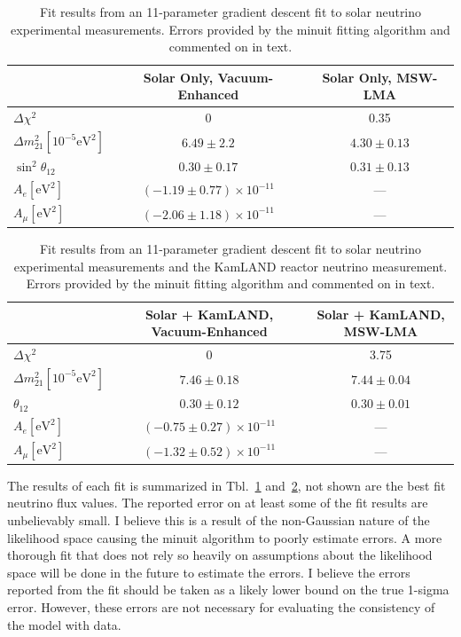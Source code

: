 \begin{table}
    \centering
    \begin{tabular}{l|c|c}
        & Solar Only, Vacuum-Enhanced& Solar Only, MSW-LMA\\
        \hline
        $\Delta \chi^{2}$ & 0 & 0.35\\
        $\Delta m^{2}_{21} [10^{-5}\mathrm{eV}^{2}]$ & $6.49\pm 2.2$ & $4.30\pm0.13$\\
        $\sin^{2}\theta_{12}$& $0.30\pm0.17$ & $0.31\pm 0.13$\\
        $A_{e}[\mathrm{eV}^{2}]$ & $(-1.19\pm 0.77)\times 10^{-11}$ & ---\\
        $A_{\mu}[\mathrm{eV}^{2}]$ & $(-2.06\pm 1.18)\times10^{-11}$ & --- \\
\end{tabular}
    \caption[Solar Only Gradient Descent Fit Results]{Fit results from
    an 11-parameter gradient descent fit to solar neutrino experimental
    measurements. Errors provided by the minuit fitting algorithm and
    commented on in text.}
\label{tbl:cham_fit_results1}
\end{table}
\begin{table}
    \centering
    \begin{tabular}{l|c|c}
        & Solar + KamLAND, Vacuum-Enhanced & Solar + KamLAND, MSW-LMA\\
        \hline
        $\Delta \chi^{2}$ & 0 &3.75\\
        $\Delta m^{2}_{21} [10^{-5}\mathrm{eV}^{2}]$ & $7.46\pm0.18$ & $7.44\pm0.04$\\
        $\theta_{12}$ & $0.30 \pm 0.12$ & $0.30\pm 0.01$\\
        $A_{e}[\mathrm{eV}^{2}]$ & $(-0.75\pm 0.27)\times 10^{-11}$ & ---\\
        $A_{\mu}[\mathrm{eV}^{2}]$ & $(-1.32\pm 0.52)\times10^{-11}$ & --- \\
\end{tabular}
    \caption[Solar + KamLAND Gradient Descent Fit Results]{Fit results from
    an 11-parameter gradient descent fit to solar neutrino experimental
    measurements and the KamLAND reactor neutrino measurement.
    Errors provided by the minuit fitting algorithm and
    commented on in text.}
\label{tbl:cham_fit_results2}
\end{table}

The results of each fit is summarized in Tbl.~\ref{tbl:cham_fit_results1}
and~\ref{tbl:cham_fit_results2}, not shown are the best fit neutrino flux values.
The reported error on at least some of the fit results are unbelievably
small.
I believe this is a result of the non-Gaussian nature of the likelihood
space causing the minuit algorithm to poorly estimate errors.
A more thorough fit that does not rely so heavily on assumptions about the
likelihood space  will be done in the future to estimate the errors.
I believe the errors reported from the fit should be taken as a likely
lower bound on the true 1-sigma error.
However, these errors are not necessary for evaluating
the consistency of the model with data.

